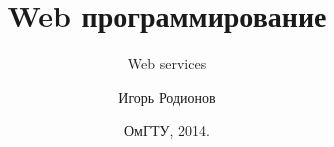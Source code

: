 \documentclass[10pt]{beamer}
\title[Web]{Web программирование}
\subtitle[Web services]{Web services}
\author[Родионов И.Н.]{Игорь Родионов}
\institute[ОмГТУ ИВТ]{Омский Государственный Технический Университет\\
	{\tiny кафедра Информатики и вычислительной техники}\\
}
\date[2014]{ОмГТУ, 2014.}
\begin{document}
\begin{frame}[plain]
\maketitle
\end{frame}














\end{document}
